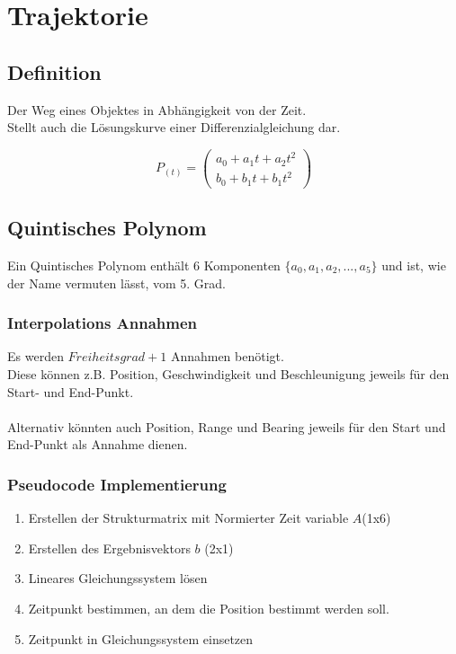 \chapter{Trajektorie}
\label{chp:trajektorie}

\section{Definition}
Der Weg eines Objektes in Abhängigkeit von der Zeit.\\
Stellt auch die Lösungskurve einer Differenzialgleichung dar.

\begin{equation}
P_{(t)} = 
\left(
\begin{array}{c}
a_0 + a_1t + a_2t^2 \\
b_0 + b_1t + b_1t^2
\end{array} 
\right)
\end{equation} 

\section{Quintisches Polynom}
Ein Quintisches Polynom enthält 6 Komponenten $\{a_0, a_1, a_2 , ..., a_5\}$ und ist, wie der Name vermuten lässt, vom 5. Grad. \\

\subsection{Interpolations Annahmen}
Es werden $Freiheitsgrad + 1$ Annahmen benötigt. \\
Diese können z.B. Position, Geschwindigkeit und Beschleunigung jeweils für den Start- und End-Punkt.\\
\\
Alternativ könnten auch Position, Range und Bearing jeweils für den Start und End-Punkt als Annahme dienen.

\subsection{Pseudocode Implementierung}
\begin{enumerate}
	\item Erstellen der Strukturmatrix mit Normierter Zeit variable  $A$(1x6)
	\item Erstellen des Ergebnisvektors $b$ (2x1)
	\item Lineares Gleichungssystem lösen
	\item Zeitpunkt bestimmen, an dem die Position bestimmt werden soll.
	\item Zeitpunkt in Gleichungssystem einsetzen
\end{enumerate}

